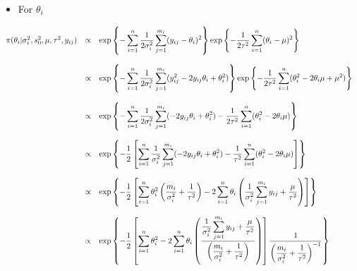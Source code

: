 \documentclass[a4paper, 11pt]{article}
\begin{document}
\begin{itemize}
\item For $\theta_i$
\end{itemize}
\begin{equation*}
\begin{array}{lcl ll }

\pi(\theta_i| \sigma_i^2, s_0^2, \mu, \tau^2, y_{ij}) & \propto & \mbox{exp}\left\{ - \displaystyle\sum_{i=1}^{n}\dfrac{1}{2\sigma_i^2}\displaystyle\sum_{j=1}^{m_i}(y_{ij} - \theta_i)^2\right\} \mbox{exp}\left\{ - \dfrac{1}{2\tau^2} 
\displaystyle\sum_{i=1}^{n} (\theta_i - \mu)^2\right\} \\ \\

& \propto & \mbox{exp}\left\{ - \displaystyle\sum_{i=1}^{n}\dfrac{1}{2\sigma_i^2}\displaystyle\sum_{j=1}^{m_i}(y_{ij}^2 - 2y_{ij}\theta_i + \theta_i^2)\right\} \mbox{exp}\left\{ - \dfrac{1}{2\tau^2} 
\displaystyle\sum_{i=1}^{n} (\theta_i^2 - 2\theta_i\mu +\mu^2)\right\}  \\ \\

& \propto & \mbox{exp}\left\{ - \displaystyle\sum_{i=1}^{n}\dfrac{1}{2\sigma_i^2}\displaystyle\sum_{j=1}^{m_i}(- 2y_{ij}\theta_i + \theta_i^2) - \dfrac{1}{2\tau^2} 
\displaystyle\sum_{i=1}^{n} (\theta_i^2 - 2\theta_i\mu)\right\} \\ \\

& \propto & \mbox{exp}\left\{ - \dfrac{1}{2} \left[ \displaystyle\sum_{i=1}^{n}\dfrac{1}{\sigma_i^2}\displaystyle\sum_{j=1}^{m_i}(- 2y_{ij}\theta_i + \theta_i^2) - \dfrac{1}{\tau^2} 
\displaystyle\sum_{i=1}^{n} (\theta_i^2 - 2\theta_i\mu)\right] \right\} \\ \\

& \propto & \mbox{exp}\left\{ - \dfrac{1}{2} \left[ \displaystyle\sum_{i=1}^{n} \theta_i^2  \left( \dfrac{m_i}{\sigma_i^2} + \dfrac{1}{\tau^2} \right) - 2 \displaystyle\sum_{i=1}^{n} \theta_i  \left( \dfrac{1}{\sigma_i^2}\displaystyle\sum_{j=1}^{m_i}y_{ij} + \dfrac{\mu}{\tau^2} \right)\right] \right\} \\ \\

& \propto & \mbox{exp}\left\{ - \dfrac{1}{2} \left[ \displaystyle\sum_{i=1}^{n} \theta_i^2 - 2 \displaystyle\sum_{i=1}^{n} \theta_i  \left( \dfrac{\dfrac{1}{\sigma_i^2}\displaystyle\sum_{j=1}^{m_i}y_{ij} + \dfrac{\mu}{\tau^2}}{ \left( \dfrac{m_i}{\sigma_i^2} + \dfrac{1}{\tau^2} \right)} \right)\right] \dfrac{1}{\left(\dfrac{m_i}{\sigma_i^2} + \dfrac{1}{\tau^2} \right)^{-1}} \right\} \\ \\

\end{array}
\end{equation*}
\end{document}
